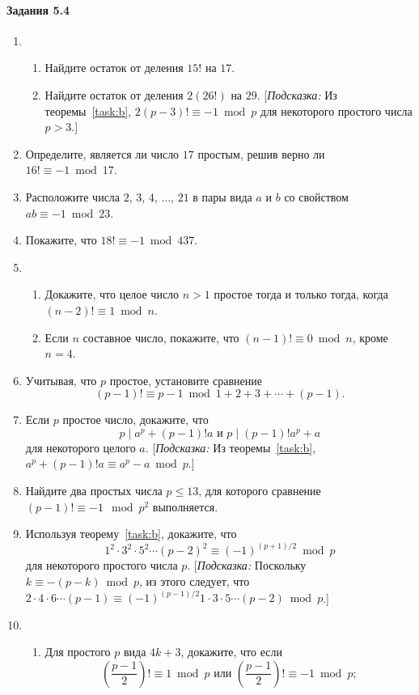 \documentclass[11pt]{article}
\begin{document}
\paragraph{Задания 5.4}
\begin{enumerate}
	\item\begin{enumerate}
		\item Найдите остаток от деления $15!$ на $17$.
		\item Найдите остаток от деления $2(26!)$ на $29$. [\textit{Подсказка:} Из теоремы~\ref{task:b}, $2(p-3)!\equiv-1\bmod p$ для некоторого простого числа $p>3$.]
		\end{enumerate}
	\item Определите, является ли число $17$ простым, решив верно ли $16!\equiv-1\bmod 17$.
	\item Расположите числа $2$, $3$, $4$, ..., $21$ в пары вида $a$ и $b$ со свойством $ab\equiv-1\bmod23$.
	\item Покажите, что $18!\equiv-1\bmod437$.
	\item\begin{enumerate}
		\item Докажите, что целое число $n>1$ простое тогда и только тогда, когда $(n-2)!\equiv1\bmod n$.
		\item Если $n$ составное число, покажите, что $(n-1)!\equiv0\bmod n$, кроме $n=4$.
		\end{enumerate}
	\item Учитывая, что $p$ простое, установите сравнение
		\[(p-1)!\equiv p-1\bmod 1+2+3+\cdots+(p-1).\]
	\item Если $p$ простое число, докажите, что
		\[p\mid a^p+(p-1)!a \text{ и } p\mid(p-1)!a^p+a\]
	для некоторого целого $a$. [\textit{Подсказка:} Из теоремы~\ref{task:b}, $a^p+(p-1)!a\equiv a^p-a\bmod p$.]
	\item Найдите два простых числа $p\le13$, для которого сравнение $(p-1)!\equiv-1\mod p^2$ выполняется.
	\item Используя теорему~\ref{task:b}, докажите, что
		\[1^2\cdot3^2\cdot5^2\cdots(p-2)^2\equiv(-1)^{(p+1)/2}\bmod p\]
	для некоторого простого числа $p$. [\textit{Подсказка:} Поскольку $k\equiv-(p-k)\bmod p$, из этого следует, что $2\cdot4\cdot6\cdots(p-1)\equiv(-1)^{(p-1)/2}1\cdot3\cdot5\cdots(p-2)\bmod p$.]
	\item\begin{enumerate}
		\item\label{task:a} Для простого $p$ вида $4k+3$, докажите, что если
			\[(\frac{p-1}{2})!\equiv1\bmod p \text{ или } (\frac{p-1}{2})!\equiv-1\bmod p;\]

\end{enumerate}
\end{enumerate}
\end{document}
